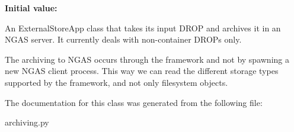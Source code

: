 {\bfseries Initial value\+:}
\begin{DoxyCode}{0}
\DoxyCodeLine{                                    \textcolor{stringliteral}{'an NGAS server. It currently deals with non-container DROPs only.'},}

\end{DoxyCode}
\begin{DoxyVerb}An ExternalStoreApp class that takes its input DROP and archives it in
an NGAS server. It currently deals with non-container DROPs only.

The archiving to NGAS occurs through the framework and not by spawning a
new NGAS client process. This way we can read the different storage types
supported by the framework, and not only filesystem objects.
\end{DoxyVerb}
 

The documentation for this class was generated from the following file\+:\begin{DoxyCompactItemize}
\item 
archiving.\+py\end{DoxyCompactItemize}
